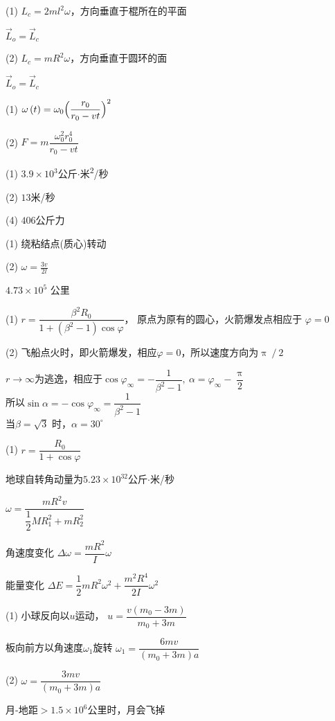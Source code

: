 \achapter

\answer (1) $ L _ { c } = 2 m l ^ 2 \omega $，方向垂直于棍所在的平面

$ \vec{L} _ { o } = \vec{L} _ { c }   $

(2) $ L _ { c } = m R ^ { 2 } \omega   $，方向垂直于圆环的面

$\vec{L} _ { o } = \vec{L} _ { c } $

\answer (1) $ \omega \left( t \right) = \omega _ { 0 } \Bigl( \dfrac { r _ { 0 } } { r _ { 0 } - v t } \Bigr) ^ { 2 }   $

(2) $F = m \dfrac { \omega _ 0 ^ { 2 } r _ 0 ^ { 4 } } { r _ { 0 } - v t } $

\answer (1) $ 3 . 9 \times 1 0 ^ { 3 } $公斤$ \cdot $米\textsuperscript{2}/秒

(2) $ 13 $米/秒

(4) $ 406 $公斤力

\answer (1) 绕粘结点(质心)转动

(2) $ \omega = \frac { 3 v } { 2 l }  $

\answer $  4 . 7 3 \times 1 0 ^ 5 $ 公里

\answer (1) $r=\dfrac{\beta^{2} R_{0}}{1+\left(\beta^{2}-1\right) \cos \varphi}$，
原点为原有的圆心，火箭爆发点相应于
$ \varphi = 0  $


(2) {\ziju{-0.05pt}飞船点火时，即火箭爆发，相应$  \varphi = 0   $，所以速度方向为$ \uppi \operatorname{/} 2 $}

$ r \to \infty $为逃逸，相应于$  \cos \varphi _ \infty = - \dfrac { 1 } { \beta ^ { 2 } - 1 }, ~ \alpha = \varphi _ \infty - \dfrac { \uppi } { 2 }  $\\[-0.5em]
所以$  \sin \alpha = - \cos \varphi _ \infty = \dfrac { 1 } { \beta ^ { 2 } - 1 }  $ \\
当$  \beta = \sqrt { 3 }  $ 时，$  \alpha = 3 0 ^ \circ  $

\answer (1) $ r = \dfrac { R _ { 0 } } { 1 + \cos \varphi } $

\answer 地球自转角动量为$ 5.23\times 10 ^ 32 $公斤$ \cdot $米/秒

\answer $\omega=\dfrac{m R^{2} v}{\dfrac{1}{2} M R_{1}^{2}+m R_{2}^{2}}$

\answer 角速度变化
$ \Delta \omega = \dfrac { m R ^ { 2 } } { I } \omega  $

能量变化 $\Delta E=\dfrac{1}{2} m R^{2} \omega^{2}+\dfrac{m^{2} R^{4}}{2 I} \omega^{2}$

\answer (1) 小球反向以$ u $运动，
$ u = \dfrac { v \left( m _ { 0 } -  3 m \right) } { m _ { 0 } + 3 m }   $

板向前方以角速度$ \omega_{ 1 } $旋转
$\omega_{1}=\dfrac{6 m v}{\left(m_{0}+3 m\right)a}$\vspace{-0.5em}

(2) $ \omega = \dfrac { 3 m v } { \left( m _ { 0 } + 3 m \right) a }   $

\answer 月-地距$  > 1 . 5 \times 1 0 ^ { 6 }   $公里时，月会飞掉
